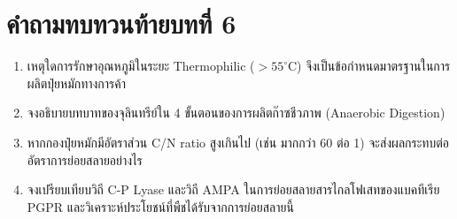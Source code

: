 \section*{คำถามทบทวนท้ายบทที่ 6}
\begin{enumerate}
    \item เหตุใดการรักษาอุณหภูมิในระยะ Thermophilic ($>55^\circ\text{C}$) จึงเป็นข้อกำหนดมาตรฐานในการผลิตปุ๋ยหมักทางการค้า
    \item จงอธิบายบทบาทของจุลินทรีย์ใน 4 ขั้นตอนของการผลิตก๊าซชีวภาพ (Anaerobic Digestion)
    \item หากกองปุ๋ยหมักมีอัตราส่วน C/N ratio สูงเกินไป (เช่น มากกว่า 60 ต่อ 1) จะส่งผลกระทบต่ออัตราการย่อยสลายอย่างไร
    \item จงเปรียบเทียบวิถี C-P Lyase และวิถี AMPA ในการย่อยสลายสารไกลโฟเสทของแบคทีเรีย PGPR และวิเคราะห์ประโยชน์ที่พืชได้รับจากการย่อยสลายนี้
\end{enumerate}

\clearpage